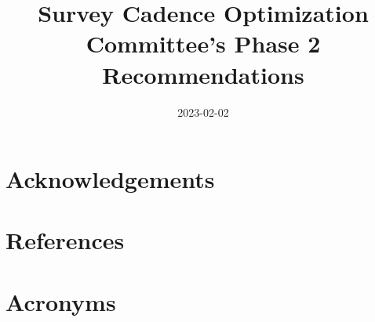 \documentclass[PST,authoryear,toc]{lsstdoc}
\title{Survey Cadence Optimization Committee's Phase 2 Recommendations}
\date{2023-02-02}
\begin{document}
\maketitle




\appendix
\section{Acknowledgements}

\section{References} \label{sec:bib}
\renewcommand{\refname}{} %


\section{Acronyms} \label{sec:acronyms}

\end{document}
